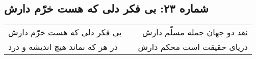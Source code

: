 \begin{center}
\section*{شماره ۲۳: بی فکر دلی که هست خرّم دارش}
\label{sec:023}
\begin{longtable}{l p{0.5cm} r}
بی فکر دلی که هست خرّم دارش
&&
نقد دو جهان جمله مسلّم دارش
\\
در هر که نماند هیچ اندیشه و درد
&&
دریای حقیقت است محکم دارش
\\
\end{longtable}
\end{center}
